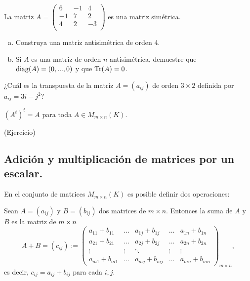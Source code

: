 \begin{ejem}
    La matriz $A=\begin{pmatrix}
    6 & -1 & 4\\
    -1 & 7 & 2\\
    4& 2 & -3\\
    \end{pmatrix}$ es una matriz simétrica.
\end{ejem}
\begin{ejer}
\begin{enumerate}[(a)]
\item Construya una matriz antisimétrica de orden 4.
\item Si $A$ es una matriz de orden $n$ antisimétrica, demuestre que $ \operatorname{diag}(A)=(0,...,0)$ y que
$\operatorname{Tr}(A)=0$. 
\end{enumerate}
\end{ejer}

\begin{ejer}
¿Cuál es la transpuesta de la matriz $A = (a_{ij})$ de orden $3 \times 2$ definida por $a_{i j} = 3i-j^2?$
\end{ejer}

\begin{prop}\label{traspuesta}
$(A^t)^t=A$ para toda $A\in M_{m\times n}(K)$.
\end{prop}
\proof (Ejercicio)



\subsection{Adici\'on y multiplicaci\'on de matrices por un escalar.}
En el conjunto de matrices $M_{m\times n}(K)$ es posible definir dos operaciones:
\begin{defin}
Sean $A = (a_{ij})$ y $B = (b_{ij})$ dos matrices de $m \times n$. Entonces la suma
de $A$ y $B$ es la matriz de $m \times n$
\[A+B=(c_{ij}):=\left(\begin{array}{ccccc}
     a_{11}+b_{11} & \dots & a_{1j}+b_{1j} &\dots & a_{1n}+b_{1n}\\
     a_{21}+b_{21} & \dots &a_{2j}+b_{2j} &\dots & a_{2n}+b_{2n}\\
     \vdots&  \vdots & \ddots &  \vdots &\vdots \\
     a_{m1}+b_{m1} & \dots & a_{mj}+b_{mj} &\dots & a_{mn}+b_{mn}
\end{array}\right)_{m\times n},\]
es decir, $c_{ij}=a_{ij}+b_{ij}$ para cada $i,j$.
\end{defin}

